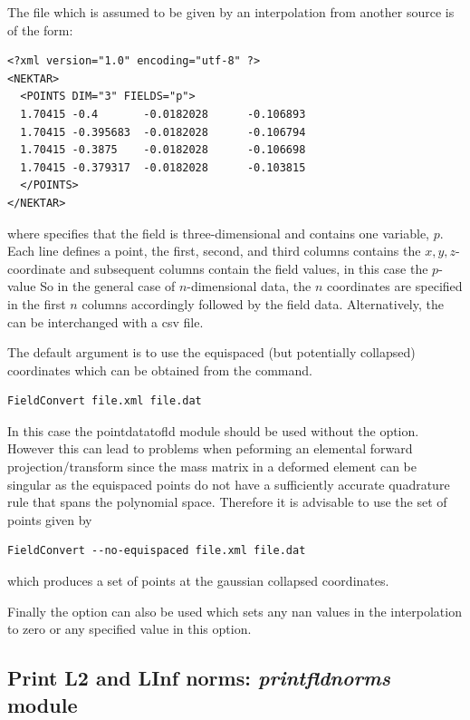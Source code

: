The file  which is assumed to be given by an interpolation from another source is of the form:
%
\begin{lstlisting}[style=XMLStyle]
<?xml version="1.0" encoding="utf-8" ?>
<NEKTAR>
  <POINTS DIM="3" FIELDS="p">
  1.70415 -0.4       -0.0182028      -0.106893
  1.70415 -0.395683  -0.0182028      -0.106794
  1.70415 -0.3875    -0.0182028      -0.106698
  1.70415 -0.379317  -0.0182028      -0.103815
  </POINTS>
</NEKTAR>
\end{lstlisting}
%
where  specifies that the field is
three-dimensional and contains one variable, $p$. Each line defines a
point, the first, second, and third columns contains the
$x,y,z$-coordinate and subsequent columns contain the field values, in
this case the $p$-value So in the general case of $n$-dimensional
data, the $n$ coordinates are specified in the first $n$ columns
accordingly followed by the field data. Alternatively, the 
can be interchanged with a csv file.

The default argument is to use the equispaced (but potentially
collapsed) coordinates which can  be obtained from the command.

\begin{lstlisting}[style=BashInputStyle]
FieldConvert file.xml file.dat
\end{lstlisting}

In this case the pointdatatofld module should be used without the
 option. However this can lead to problems when
peforming an elemental forward projection/transform since the mass
matrix in a deformed element can be singular as the equispaced points
do not have a sufficiently accurate quadrature rule that spans the
polynomial space. Therefore it is advisable to use the set of points
given by

\begin{lstlisting}[style=BashInputStyle]
FieldConvert --no-equispaced file.xml file.dat
\end{lstlisting}

which produces a set of points at the gaussian collapsed
coordinates.

Finally the option  can also be used which sets
any nan values in the interpolation to zero or any specified value in
this option.

%
%
%

\subsection{Print L2 and LInf norms: \textit{printfldnorms} module}

